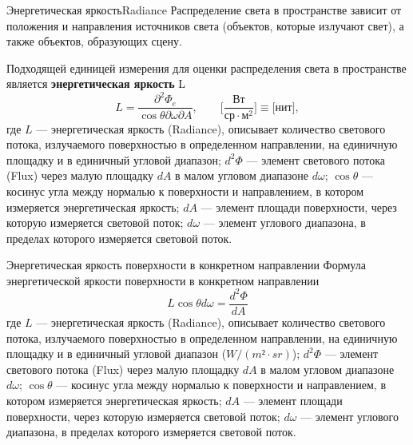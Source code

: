\documentclass{beamer}
\begin{document}
	\begin{frame}{Энергетическая яркость}{Radiance}
		Распределение света в пространстве зависит от положения и направления источников света (объектов, которые излучают свет), а также объектов, образующих сцену.

		Подходящей единицей измерения для оценки распределения света в пространстве является \textbf{энергетическая яркость} L
		\[
			L = \frac{\partial^2 \Phi_e}{\cos \theta \partial \omega \partial A}
			, \qquad 
			\bigg[ \frac{\text{Вт}}{ \text{ср} \cdot \text{м}^2} \bigg]  
			\equiv  
			\bigg[ \text{нит} \bigg]
			,
		\]
		\footnotesize
		где 
		$L$ --- энергетическая яркость (Radiance), описывает количество светового потока, излучаемого поверхностью в определенном направлении, на единичную площадку и в единичный угловой диапазон;
		$d^2 \Phi$ --- элемент светового потока (Flux) через малую площадку $dA$  в малом угловом диапазоне $d \omega$;
		$\cos \theta$ --- косинус угла между нормалью к поверхности и направлением, в котором измеряется энергетическая яркость;
		$dA$ --- элемент площади поверхности, через которую измеряется световой поток;
		$d \omega$ --- элемент углового диапазона, в пределах которого измеряется световой поток.
		

	\end{frame}

	\begin{frame}{Энергетическая яркость поверхности в конкретном направлении}
		Формула энергетической яркости поверхности в конкретном направлении
		\[
			L \cos \theta d \omega = \frac{d^2 \Phi}{ d A}
		\] 
		где 
		$L$ --- энергетическая яркость (Radiance), описывает количество светового потока, излучаемого поверхностью в определенном направлении, на единичную площадку и в единичный угловой диапазон ($W/(m²\cdot sr)$);
		$d^2 \Phi$ --- элемент светового потока (Flux) через малую площадку $dA$  в малом угловом диапазоне $d \omega$;
		$\cos \theta$ --- косинус угла между нормалью к поверхности и направлением, в котором измеряется энергетическая яркость;
		$dA$ --- элемент площади поверхности, через которую измеряется световой поток;
		$d \omega$ --- элемент углового диапазона, в пределах которого измеряется световой поток.
		
	\end{frame}
\end{document}
